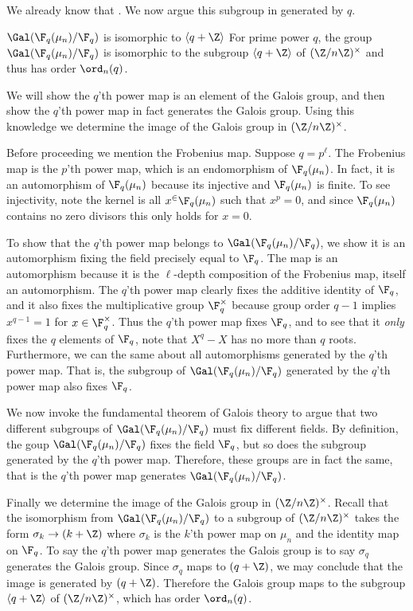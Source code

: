 We already know that .
We now argue this subgroup in generated by $q$.

\begin{theorem}{$\Gal(\F_q(\mu_n)/\F_q)$ is isomorphic to $\langle q+\Z\rangle$}
    For prime power $q$, the group $\Gal(\F_q(\mu_n)/\F_q)$ is isomorphic to the subgroup $\langle q+\Z\rangle$ of $(\Z/n\Z)^\times$ and thus has order $\ord_n(q)$.

    \proof
    We will show the $q$'th power map is an element of the Galois group, and then show the $q$'th power map in fact generates the Galois group.
    Using this knowledge we determine the image of the Galois group in $(\Z/n\Z)^\times$.

    Before proceeding we mention the Frobenius map.
    Suppose $q=p^\ell$.
    The Frobenius map is the $p$'th power map, which is an endomorphism of $\F_q(\mu_n)$.
    In fact, it is an automorphism of $\F_q(\mu_n)$ because its injective and $\F_q(\mu_n)$ is finite.
    To see injectivity, note the kernel is all $x^\in\F_q(\mu_n)$ such that $x^p=0$, and since $\F_q(\mu_n)$ contains no zero divisors this only holds for $x=0$.

    To show that the $q$'th power map belongs to $\Gal(\F_q(\mu_n)/\F_q)$, we show it is an automorphism fixing the field precisely equal to $\F_q$.
    The map is an automorphism because it is the $\ell$-depth composition of the Frobenius map, itself an automorphism.
    The $q$'th power map clearly fixes the additive identity of $\F_q$, and it also fixes the multiplicative group $\F_q^\times$ because group order $q-1$ implies $x^{q-1}=1$ for $x\in\F_q^\times$.
    Thus the $q$'th power map fixes $\F_q$, and to see that it \emph{only} fixes the $q$ elements of $\F_q$, note that $X^q-X$ has no more than $q$ roots.
    Furthermore, we can the same about all automorphisms generated by the $q$'th power map. 
    That is, the subgroup of $\Gal(\F_q(\mu_n)/\F_q)$ generated by the $q$'th power map also fixes $\F_q$.

    We now invoke the fundamental theorem of Galois theory to argue that two different subgroups of $\Gal(\F_q(\mu_n)/\F_q)$ must fix different fields.
    By definition, the goup $\Gal(\F_q(\mu_n)/\F_q)$ fixes the field $\F_q$, but so does the subgroup generated by the $q$'th power map.
    Therefore, these groups are in fact the same, that is the $q$'th power map generates $\Gal(\F_q(\mu_n)/\F_q)$.

    Finally we determine the image of the Galois group in $(\Z/n\Z)^\times$.
    Recall that the isomorphism from $\Gal(\F_q(\mu_n)/\F_q)$ to a subgroup of $(\Z/n\Z)^\times$ takes the form $\sigma_k\to(k+\Z)$ where $\sigma_k$ is the $k$'th power map on $\mu_n$ and the identity map on $\F_q$.
    To say the $q$'th power map generates the Galois group is to say $\sigma_q$ generates the Galois group.
    Since $\sigma_q$ maps to $(q+\Z)$, we may conclude that the image is generated by $(q+\Z)$.
    Therefore the Galois group maps to the subgroup $\langle q+\Z\rangle$ of $(\Z/n\Z)^\times$, which has order $\ord_n(q)$.
\end{theorem}

